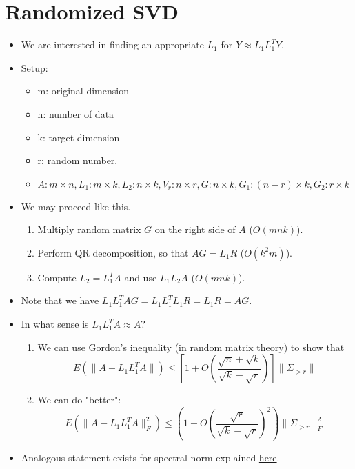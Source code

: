 \documentclass[11pt,reqno]{amsart}
\theoremstyle{remark}
\begin{document}
\begin{sloppypar}
\section{Randomized SVD}
\begin{itemize}
\item We are interested in finding an appropriate $L_1$ for $Y\approx L_1 L_1^T Y$.
\item Setup:
\begin{itemize}
\item m: original dimension
\item n: number of data
\item k: target dimension
\item r: random number. 
\item $A:m\times n,L_1:m\times k, L_2: n\times k, V_r:n\times r, G: n\times k, G_1:(n-r)\times k,G_2:r\times k$
\end{itemize}
\item We may proceed like this.
\begin{enumerate}
\item Multiply random matrix $G$ on the right side of $A$ ($O(mnk)$).
\item Perform QR decomposition, so that $AG=L_1 R$ ($O(k^2m)$).
\item Compute $L_2=L_1^T A$ and use $L_1 L_2A$ ($O(mnk)$).
\end{enumerate}
\item Note that we have $L_1L_1^TAG=L_1L_1^TL_1R=L_1R=AG$.
\item In what sense is $L_1 L_1^T A\approx A$?
\begin{enumerate}
\item We can use \href{https://www.math.uci.edu/~rvershyn/teaching/2006-07/280/lec10.pdf}{Gordon's inequality}
(in random matrix theory) to show that
\[
E(\lVert A-L_1L_1^T A\rVert)\leq [1+O(\frac{\sqrt{n}
+\sqrt{k}}{\sqrt{k}-\sqrt{r}})]\lVert \Sigma_{>r}\rVert
\]
\item We can do "better":
\[
E(\lVert A-L_1L_1^T A\rVert_F^2)\leq (1+O(\frac{\sqrt{r}}{\sqrt{k}
-\sqrt{r}})^2)\lVert\Sigma_{>r}\rVert_F^2
\]
\end{enumerate}
\item Analogous statement exists for spectral norm explained \href{chrome-extension://efaidnbmnnnibpcajpcglclefindmkaj/https://arxiv.org/pdf/0909.4061.pdf}{here}. 


\end{itemize}
\end{sloppypar}
\end{document}
